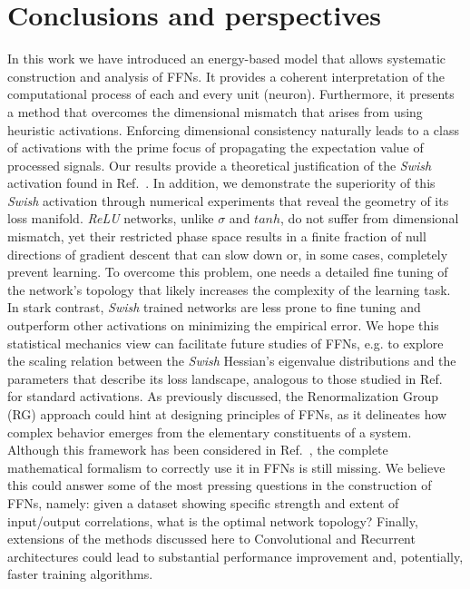 \documentclass[5p]{elsarticle}
\begin{document}
\section{Conclusions and perspectives}
%
In this work we have introduced an energy-based model that allows systematic construction and analysis of FFNs. It provides a  coherent interpretation of the computational process of each and every unit (neuron). Furthermore, it presents a method that overcomes the dimensional mismatch that arises from using heuristic activations. Enforcing dimensional consistency naturally leads to a class of activations with the prime focus of propagating the expectation value of processed signals. Our results provide a theoretical justification of the \textit{Swish} activation found in Ref.~\cite{prajit}. In addition, we demonstrate the superiority of this {\it Swish} activation through numerical experiments that reveal the geometry of its loss manifold. {\it ReLU} networks, unlike $\sigma$ and $tanh$,  do not suffer from dimensional mismatch, yet their restricted phase space results in a finite fraction of null directions of gradient descent that can slow down or, in some cases, completely prevent learning. To overcome this problem, one needs a detailed fine tuning of the network's topology that likely increases the complexity of the learning task. In stark contrast, {\it Swish} trained networks are less prone to fine tuning and outperform other activations on minimizing the empirical error. We hope this statistical mechanics view can facilitate future studies of FFNs, e.g. to explore the scaling relation between the {\it Swish} Hessian's eigenvalue distributions and the parameters that describe its loss landscape, analogous to those studied in Ref.~\cite{penn1} for standard activations. As previously discussed, the Renormalization Group (RG) approach could hint at designing principles of FFNs, as it delineates how complex behavior emerges from the elementary constituents of a system. Although this framework has been considered in Ref.~\cite{mehta, maciej}, the complete mathematical formalism to correctly use it in FFNs is still missing. We believe this could answer some of the most pressing questions in the construction of FFNs, namely: given a dataset showing specific strength and extent of input/output correlations, what is the optimal network topology? Finally, extensions of the methods discussed here to Convolutional and Recurrent architectures could lead to substantial performance improvement and, potentially, faster training algorithms.
\end{document}
